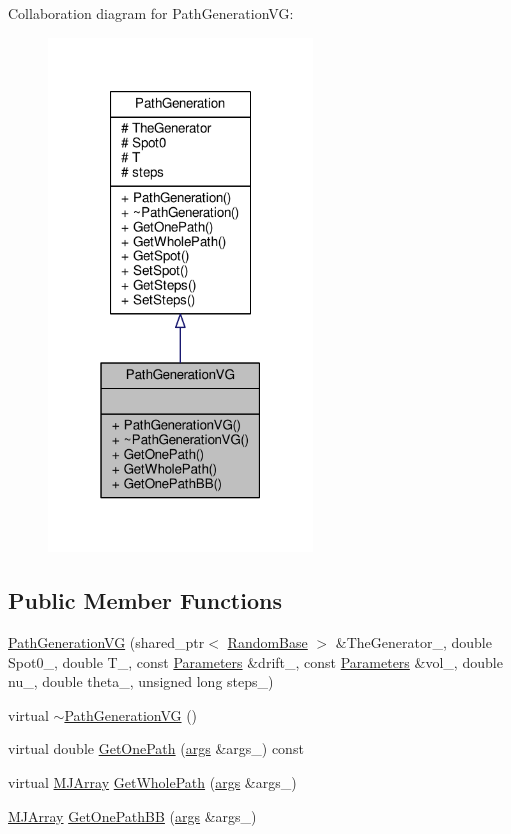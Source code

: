 Collaboration diagram for Path\+Generation\+VG\+:
\nopagebreak
\begin{figure}[H]
\begin{center}
\leavevmode
\includegraphics[width=199pt]{classPathGenerationVG__coll__graph}
\end{center}
\end{figure}
\subsection*{Public Member Functions}
\begin{DoxyCompactItemize}
\item 
\hyperlink{classPathGenerationVG_acc238316e8737283347c3ce19a72164d}{Path\+Generation\+VG} (shared\+\_\+ptr$<$ \hyperlink{classRandomBase}{Random\+Base} $>$ \&The\+Generator\+\_\+, double Spot0\+\_\+, double T\+\_\+, const \hyperlink{classParameters}{Parameters} \&drift\+\_\+, const \hyperlink{classParameters}{Parameters} \&vol\+\_\+, double nu\+\_\+, double theta\+\_\+, unsigned long steps\+\_\+)
\item 
virtual \hyperlink{classPathGenerationVG_aaedfa54f5f956ab4027822d035d39077}{$\sim$\+Path\+Generation\+VG} ()
\item 
virtual double \hyperlink{classPathGenerationVG_ae5b96a684d59be9b06aa3b2eb8ac5b5f}{Get\+One\+Path} (\hyperlink{path__generation_8h_a75c13cde2074f502cc4348c70528572d}{args} \&args\+\_\+) const
\item 
virtual \hyperlink{classMJArray}{M\+J\+Array} \hyperlink{classPathGenerationVG_a298f0f8b2b11e912558044a8a2b5d8e9}{Get\+Whole\+Path} (\hyperlink{path__generation_8h_a75c13cde2074f502cc4348c70528572d}{args} \&args\+\_\+)
\item 
\hyperlink{classMJArray}{M\+J\+Array} \hyperlink{classPathGenerationVG_ab5a58fdf0b8c9354745dcb8d91304eea}{Get\+One\+Path\+BB} (\hyperlink{path__generation_8h_a75c13cde2074f502cc4348c70528572d}{args} \&args\+\_\+)
\end{DoxyCompactItemize}
